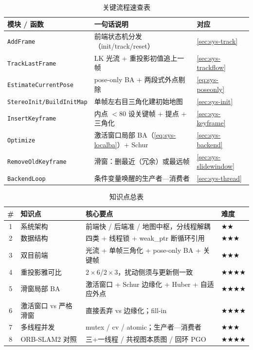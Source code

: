 \begin{table}[H]\centering\small
\caption{关键流程速查表}
\begin{tabular}{lll}
\toprule
模块 / 函数 & 一句话说明 & 对应 \\
\midrule
\texttt{AddFrame} & 前端状态机分发（init/track/reset） & \cref{sec:sys-track} \\
\texttt{TrackLastFrame} & LK 光流 + 重投影初值追上一帧 & \cref{sec:sys-trackflow} \\
\texttt{EstimateCurrentPose} & pose-only BA + 两段式外点剔除 & \cref{eq:sys-poseonly} \\
\texttt{StereoInit/BuildInitMap} & 单帧左右目三角化建初始地图 & \cref{sec:sys-init} \\
\texttt{InsertKeyframe} & 内点 $<80$ 设关键帧 + 提点 + 三角化 & \cref{sec:sys-keyframe} \\
\texttt{Optimize} & 激活窗口局部 BA（\cref{eq:sys-localba}）+ Schur & \cref{sec:sys-backend} \\
\texttt{RemoveOldKeyframe} & 滑窗：删最近（冗余）或最远帧 & \cref{sec:sys-slidewindow} \\
\texttt{BackendLoop} & 条件变量唤醒的生产者—消费者 & \cref{sec:sys-thread} \\
\bottomrule
\end{tabular}
\end{table}

\begin{table}[H]\centering\small
\caption{知识点总表}
\begin{tabular}{clll}
\toprule
\# & 知识点 & 核心要点 & 难度 \\
\midrule
1 & 系统架构 & 前端快 / 后端准 / 地图中枢，分线程解耦 & $\bigstar\bigstar$ \\
2 & 数据结构 & 四类 + 线程锁 + weak\_ptr 断循环引用 & $\bigstar\bigstar\bigstar$ \\
3 & 双目前端 & 光流 + 单帧三角化 + pose-only BA + 关键帧 & $\bigstar\bigstar\bigstar$ \\
4 & 重投影雅可比 & $2\times6$/$2\times3$，扰动侧须与更新侧一致 & $\bigstar\bigstar\bigstar\bigstar$ \\
5 & 滑窗局部 BA & 激活窗口 + Schur 边缘化 + Huber + 自适应外点 & $\bigstar\bigstar\bigstar\bigstar$ \\
6 & 激活窗口 vs 严格滑窗 & 直接丢弃 vs 边缘化；fill-in & $\bigstar\bigstar\bigstar\bigstar$ \\
7 & 多线程并发 & mutex / cv / atomic；生产者—消费者 & $\bigstar\bigstar\bigstar$ \\
8 & ORB-SLAM2 对照 & 三+一线程 / 共视图本质图 / 回环 PGO & $\bigstar\bigstar\bigstar\bigstar$ \\
\bottomrule
\end{tabular}
\end{table}


